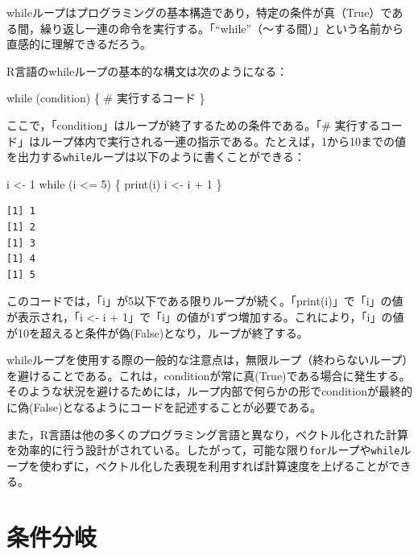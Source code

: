 \documentclass[
  a4paper,
]{ltjsbook}
\newenvironment{Shaded}{\begin{snugshade}}{\end{snugshade}}
\newcommand{\CommentTok}[1]{\textcolor[rgb]{0.37,0.37,0.37}{#1}}
\newcommand{\ControlFlowTok}[1]{\textcolor[rgb]{0.00,0.23,0.31}{#1}}
\newcommand{\DecValTok}[1]{\textcolor[rgb]{0.68,0.00,0.00}{#1}}
\newcommand{\FunctionTok}[1]{\textcolor[rgb]{0.28,0.35,0.67}{#1}}
\newcommand{\NormalTok}[1]{\textcolor[rgb]{0.00,0.23,0.31}{#1}}
\newcommand{\OtherTok}[1]{\textcolor[rgb]{0.00,0.23,0.31}{#1}}
\newcommand{\SpecialCharTok}[1]{\textcolor[rgb]{0.37,0.37,0.37}{#1}}
\begin{document}
whileループはプログラミングの基本構造であり，特定の条件が真（True）である間，繰り返し一連の命令を実行する。「``while''（～する間）」という名前から直感的に理解できるだろう。

R言語のwhileループの基本的な構文は次のようになる：

\begin{Shaded}
\begin{Highlighting}[]
\ControlFlowTok{while}\NormalTok{ (condition) \{}
    \CommentTok{\# 実行するコード}
\NormalTok{\}}
\end{Highlighting}
\end{Shaded}

ここで，「condition」はループが終了するための条件である。「\#
実行するコード」はループ体内で実行される一連の指示である。たとえば，1から10までの値を出力する\texttt{while}ループは以下のように書くことができる：

\begin{Shaded}
\begin{Highlighting}[]
\NormalTok{i }\OtherTok{\textless{}{-}} \DecValTok{1}
\ControlFlowTok{while}\NormalTok{ (i }\SpecialCharTok{\textless{}=} \DecValTok{5}\NormalTok{) \{}
  \FunctionTok{print}\NormalTok{(i)}
\NormalTok{  i }\OtherTok{\textless{}{-}}\NormalTok{ i }\SpecialCharTok{+} \DecValTok{1}
\NormalTok{\}}
\end{Highlighting}
\end{Shaded}

\begin{verbatim}
[1] 1
[1] 2
[1] 3
[1] 4
[1] 5
\end{verbatim}

このコードでは，「i」が5以下である限りループが続く。「print(i)」で「i」の値が表示され，「i
\textless- i +
1」で「i」の値が1ずつ増加する。これにより，「i」の値が10を超えると条件が偽(False)となり，ループが終了する。

whileループを使用する際の一般的な注意点は，無限ループ（終わらないループ）を避けることである。これは，conditionが常に真(True)である場合に発生する。そのような状況を避けるためには，ループ内部で何らかの形でconditionが最終的に偽(False)となるようにコードを記述することが必要である。

また，R言語は他の多くのプログラミング言語と異なり，ベクトル化された計算を効率的に行う設計がされている。したがって，可能な限り\texttt{for}ループや\texttt{while}ループを使わずに，ベクトル化した表現を利用すれば計算速度を上げることができる。

\section{条件分岐}\label{ux6761ux4ef6ux5206ux5c90}
\end{document}
